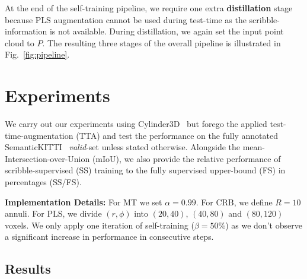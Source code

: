 \documentclass[10pt,twocolumn,letterpaper]{article}
\begin{document}
At the end of the self-training pipeline, we require one extra \textbf{distillation} stage because PLS augmentation cannot be used during test-time as the scribble-information is not available. During distillation, we again set the input point cloud to $P$. The resulting three stages of the overall pipeline is illustrated in Fig.~\ref{fig:pipeline}.

\section{Experiments}

We carry out our experiments using Cylinder3D~\cite{cvpr2021cylindrical} but forego the applied test-time-augmentation (TTA) and test the performance on the fully annotated SemanticKITTI~\cite{iccv2019semantickitti} \textit{valid}-set unless stated otherwise. Alongside the mean-Intersection-over-Union (mIoU), we also provide the relative performance of scribble-supervised (SS) training to the fully supervised upper-bound (FS) in percentages (SS/FS).

\noindent \textbf{Implementation Details:} For MT we set $\alpha=0.99$. For CRB, we define $R=10$ annuli. For PLS, we divide $(r,\phi)$ into $(20,40)$, $(40,80)$ and $(80,120)$ voxels. We only apply one iteration of self-training  ($\beta=50\%$) as we don't observe a significant increase in performance in consecutive steps.

\subsection{Results}
\end{document}
